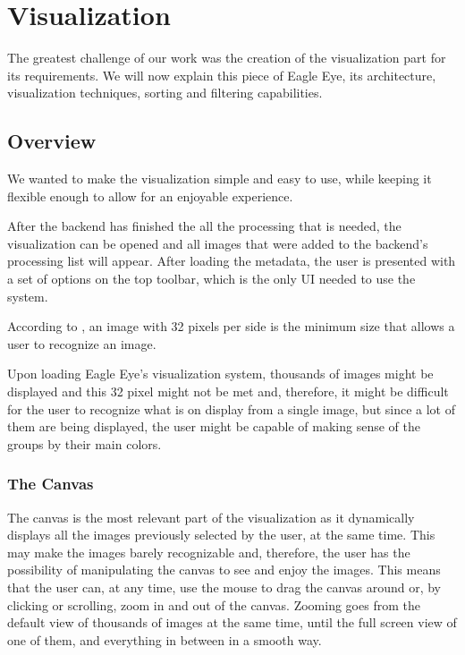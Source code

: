 \section{Visualization} %
\label{sub:visualization}

The greatest challenge of our work was the creation of the visualization part for its requirements. We will now explain this piece of Eagle Eye, its architecture, visualization techniques, sorting and filtering capabilities.

\subsection{Overview}
We wanted to make the visualization simple and easy to use, while keeping it flexible enough to allow for an enjoyable experience.

After the backend has finished the all the processing that is needed, the visualization can be opened and all images that were added to the backend's processing list will appear. After loading the metadata, the user is presented with a set of options on the top toolbar, which is the only \ac{UI} needed to use the system. 


According to , an image with 32 pixels per side is the minimum size that allows a user to recognize an image.

 Upon loading Eagle Eye's visualization system, thousands of images might be displayed and this 32 pixel might not be met and, therefore, it might be difficult for the user to recognize what is on display from a single image, but since a lot of them are being displayed, the user might be capable of making sense of the groups by their main colors.

\subsubsection{The Canvas}

The canvas is the most relevant part of the visualization as it dynamically displays all the images previously selected by the user, at the same time. This may make the images barely recognizable and, therefore, the user has the possibility of manipulating the canvas to see and enjoy the images.
This means that the user can, at any time, use the mouse to drag the canvas around or, by clicking or scrolling, zoom in and out of the canvas. Zooming goes from the default view of thousands of images at the same time, until the full screen view of one of them, and everything in between in a smooth way.

